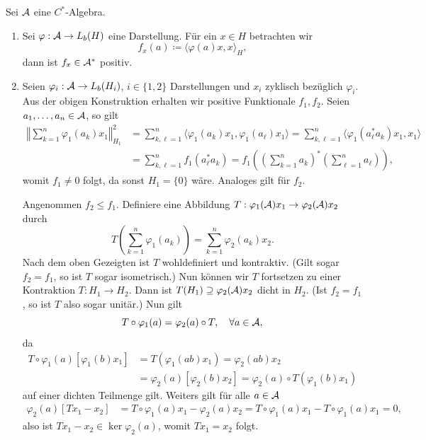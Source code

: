 
\begin{remark}
    Sei $\mathcal{A}$ eine $C^*$-Algebra.
    \begin{enumerate}
        \item Sei $\varphi : \mathcal{A} \to L_b(H)$ eine Darstellung. Für ein $x \in H$ betrachten wir
        \[
            f_x(a) \coloneqq \langle \varphi(a) x, x \rangle_H,
        \]
        dann ist $f_x \in \mathcal{A}^*$ positiv.

        \item Seien $\varphi_i : \mathcal{A} \to L_b(H_i)$, $i \in \{1,2\}$ Darstellungen und $x_i$ zyklisch bezüglich $\varphi_i$. Aus der obigen Konstruktion erhalten wir positive Funktionale $f_1, f_2$. Seien $a_1, \ldots, a_n \in \mathcal{A}$, so gilt
        \begin{align*}
            \left\Vert \sum_{k=1}^n \varphi_1 (a_k) x_1 \right\Vert_{H_1}^2
            &=
            \sum_{k,\ell=1}^n \langle \varphi_1(a_k) x_1, \varphi_1 (a_\ell) x_1 \rangle
            =
            \sum_{k,\ell=1}^n \langle \varphi_1(a_\ell^* a_k) x_1, x_1 \rangle
            \\ &=
            \sum_{k,\ell=1}^n f_1(a_\ell^* a_k)
            =
            f_1 \left( \left( \sum_{k=1}^n a_k \right)^* \left( \sum_{\ell=1}^n a_\ell \right) \right),
        \end{align*}
        womit $f_1 \neq 0$ folgt, da sonst $H_1 = \{0\}$ wäre. Analoges gilt für $f_2$.

        Angenommen $f_2 \leq f_1$. Definiere eine Abbildung $T : \varphi_1 (\mathcal{A}) x_1 \to \varphi_2 (\mathcal{A}) x_2$ durch
        \[
            T \left( \sum_{k=1}^n \varphi_1 (a_k) \right) = \sum_{k=1}^n \varphi_2 (a_k) x_2.
        \]
        Nach dem oben Gezeigten ist $T$ wohldefiniert und kontraktiv. (Gilt sogar $f_2 = f_1$, so ist $T$ sogar isometrisch.) Nun können wir $T$ fortsetzen zu einer Kontraktion $T : H_1 \to H_2$. Dann ist $T(H_1) \supseteq \varphi_2(\mathcal{A}) x_2$ dicht in $H_2$. (Ist $f_2 = f_1$, so ist $T$ also sogar unitär.) Nun gilt
        \[
            T \circ \varphi_1(a) = \varphi_2(a) \circ T, \quad \forall a \in \mathcal{A},
        \]
        da
        \begin{align*}
            T \circ \varphi_1(a) [ \varphi_1(b) x_1]
            &=
            T (\varphi_1 (ab) x_1)
            =
            \varphi_2(ab) x_2
            \\ &=
            \varphi_2(a) [ \varphi_2(b) x_2 ]
            =
            \varphi_2(a) \circ T (\varphi_1(b) x_1)
        \end{align*}
        auf einer dichten Teilmenge gilt. Weiters gilt für alle $a \in \mathcal{A}$
        \begin{align*}
            \varphi_2(a) [ Tx_1 - x_2 ]
            &=
            T \circ \varphi_1(a) x_1 - \varphi_2(a) x_2
            =
            T \circ \varphi_1(a) x_1 - T \circ \varphi_1(a) x_1
            =
            0,
        \end{align*}
        also ist $T x_1 - x_2 \in \ker \varphi_2(a)$, womit $Tx_1 = x_2$ folgt.


\end{enumerate}
\end{remark}
